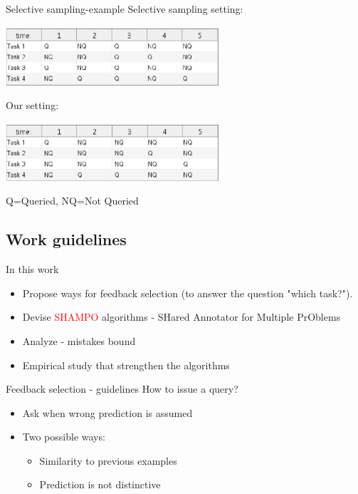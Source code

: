 \documentclass{beamer}
\begin{document}
\begin{frame}{Selective sampling-example}
Selective sampling setting:
\begin{center}
\includegraphics[width=0.6\textwidth]{figs/Table_ss.eps}
\end{center}
Our setting:
\begin{center}
\includegraphics[width=0.6\textwidth]{figs/Table_shampo.eps}
\end{center}
Q=Queried,   NQ=Not Queried
\end{frame}

\subsection{Work guidelines}

\begin{frame}{In this work}
\begin{itemize}
\item Propose  ways for feedback selection (to answer the question "which task?").   \newline
\item Devise    \textcolor{red}{SHAMPO} algorithms  - SHared Annotator for Multiple PrOblems\newline
\item Analyze -  mistakes bound \newline
\item Empirical study that strengthen the algorithms\newline
\end{itemize}
\end{frame}


\begin{frame}{Feedback selection - guidelines}
How to issue a query?\newline
\begin{itemize}
\item Ask when  wrong prediction is assumed\newline
\item Two possible ways:\newline
\begin{itemize}
\item Similarity to previous  examples \newline
\item Prediction is not distinctive\end{itemize}
\end{itemize}
\end{frame}
\end{document}
